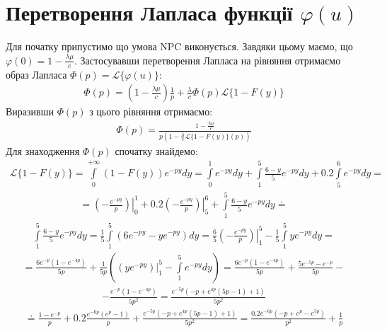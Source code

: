 \documentclass{article}
\newcommand{\intl}{\int\limits}
\begin{document}
    \section{Перетворення Лапласа функції $\varphi(u)$}
    Для початку припустимо що умова NPC виконується. Завдяки цьому маємо, що $\varphi(0) =
    1 - \frac{\lambda\mu}{c}$. 
    Застосувавши перетворення Лапласа на рівняння  отримаємо образ Лапласа 
    $\Phi(p) = \mathcal{L}\{\varphi(u)\}$:
    \begin{gather}
        \Phi(p) = \left(1 - \frac{\lambda\mu}{c}\right)\frac{1}{p} + \frac{\lambda}{c}\Phi(p)
        \mathcal{L}\{1 - F(y)\}
    \end{gather}
    Виразивши $\Phi(p)$ з цього рівняння отримаємо:
    \begin{gather}\label{Phi_fin}
        \Phi(p) = \frac{1 - \frac{\lambda \mu}{c}}{p\left(
            1 - \frac{\lambda}{c}\mathcal{L}\{ 1 - F(y) \}(p)
        \right)}
    \end{gather}
    Для знаходження $\Phi(p)$ спочатку знайдемо:
    \begin{gather}
        \mathcal{L}\{1 - F(y)\} = \intl_{0}^{+ \infty} \left(1 - F(y)\right) e^{-py}dy = 
        \intl_0^1 e^{-py}dy + \intl_1^5 \frac{6-y}{5}e^{-py}dy + 0.2\intl_5^6 e^{-py}dy = 
    \end{gather}
    \begin{gather*}
        = \left.\left(-\frac{e^{-py}}{p}\right)\right|_0^1 + 
        0.2\left.\left(-\frac{e^{-py}}{p}\right)\right|_5^6 + 
        \intl_1^5 \frac{6-y}{5}e^{-py}dy
        \doteq 
    \end{gather*}
    \begin{gather}
        \intl_1^5 \frac{6-y}{5}e^{-py}dy = \frac{1}{5} \intl_1^5 (6e^{-py} - ye^{-py})dy = 
        \frac{6}{5}\left.\left(-\frac{e^{-py}}{p}\right)\right|_1^5 - 
        \frac{1}{5}\intl_1^5 ye^{-py}dy =
    \end{gather}
    \begin{gather*}
        = \frac{6e^{-p}(1-e^{-4p})}{5p} + \frac{1}{5p}\left(
            \left.\left(
                ye^{-py}
            \right)\right|_1^5 - \intl_1^5 e^{-py} dy
        \right) =
        \frac{6e^{-p}(1-e^{-4p})}{5p} + \frac{5e^{-5p} - e^{-p}}{5p} - 
    \end{gather*}
    \begin{gather*}
        -\frac{e^{-p}(1-e^{-4p})}{5p^2} = \frac{e^{-5p}\left(-p+e^{4p}(5p-1)+1\right)}{5p^2}
    \end{gather*}
    \begin{gather*}
        \doteq \frac{1 - e^{-p}}{p} + 0.2\frac{e^{-6p}(e^p-1)}{p} + 
        \frac{e^{-5p}\left(-p+e^{4p}(5p-1)+1\right)}{5p^2} = 
        \frac{0.2e^{-6p}(-p + e^p - e^{5p})}{p^2} + \frac{1}{p}
    \end{gather*}
\end{document}
